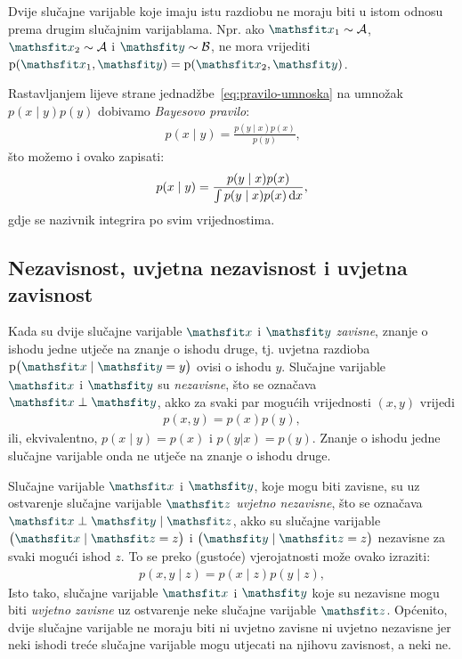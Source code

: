 \documentclass[utf8, diplomski, lmodern]{fer}
\begin{document}
Dvije slučajne varijable koje imaju istu razdiobu ne moraju biti u istom odnosu prema drugim slučajnim varijablama. Npr. ako $\rvar x_1\sim\mathcal A$, $\rvar x_2\sim\mathcal A$ i $\rvar y\sim\mathcal B$, ne mora vrijediti $\p(\rvar x_1, \rvar y) = \p(\rvar x_2, \rvar y)$.

Rastavljanjem lijeve strane jednadžbe~\eqref{eq:pravilo-umnoska} na umnožak $p(x\mid y)p(y)$ dobivamo \emph{Bayesovo pravilo}:
\begin{align}
p(x\mid y) = \frac{p(y\mid x)p(x)}{p(y)} \text{,}
\end{align}
što možemo i ovako zapisati:
\begin{align}
p(x\mid y) = \frac{p(y\mid x)p(x)}{\int p(y\mid x)p(x)\dif x} \text{,}
\end{align}
gdje se nazivnik integrira po svim vrijednostima.

\subsection{Nezavisnost, uvjetna nezavisnost i uvjetna zavisnost}

Kada su dvije slučajne varijable $\rvar x$ i $\rvar y$ \emph{zavisne}, znanje o ishodu jedne utječe na znanje o ishodu druge, tj. uvjetna razdioba $\p\del{\rvar x\mid\rvar y = y}$ ovisi o ishodu $y$.
Slučajne varijable $\rvar x$ i $\rvar y$ su \emph{nezavisne}, što se označava $\rvar x\perp\rvar y$, akko za svaki par mogućih vrijednosti $(x, y)$ vrijedi
\begin{align}
p(x,y) = p(x)p(y),
\end{align}
ili, ekvivalentno, $p(x\mid y)=p(x)$ i $p(y|x)=p(y)$. Znanje o ishodu jedne slučajne varijable onda ne utječe na znanje o ishodu druge.

Slučajne varijable $\rvar x$ i $\rvar y$, koje mogu biti zavisne, su uz ostvarenje slučajne varijable $\rvar z$ \emph{uvjetno nezavisne}, što se označava $\rvar x\perp\rvar y\mid\rvar z$, akko su slučajne varijable $\del{\rvar x\mid\rvar z=z}$ i $\del{\rvar y\mid\rvar z=z}$ nezavisne za svaki mogući ishod $z$. To se preko (gustoće) vjerojatnosti može ovako izraziti:
\begin{align}
p(x,y\mid z) = p(x\mid z)p(y\mid z),
\end{align}
Isto tako, slučajne varijable $\rvar x$ i $\rvar y$ koje su nezavisne mogu biti \emph{uvjetno zavisne} uz ostvarenje neke slučajne varijable $\rvar z$. Općenito, dvije slučajne varijable ne moraju biti ni uvjetno zavisne ni uvjetno nezavisne jer neki ishodi treće slučajne varijable mogu utjecati na njihovu zavisnost, a neki ne.
\end{document}
